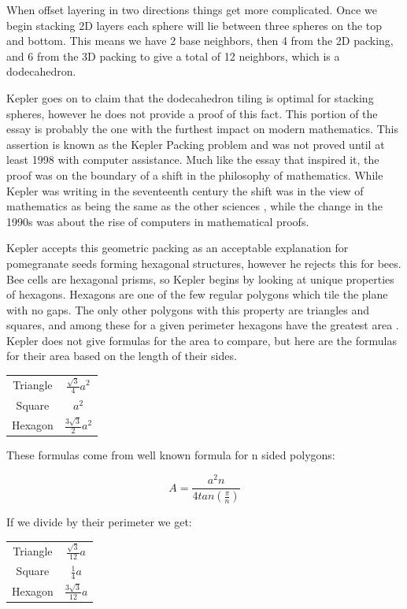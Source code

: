 \documentclass{report}
\begin{document}
When offset layering in two directions things get more complicated. Once we begin stacking 2D layers each sphere will lie between
three spheres on the top and bottom. This means we have 2 base neighbors, then 4 from the 2D packing, and 6 from the 3D packing to
give a total of 12 neighbors, which is a dodecahedron. 

Kepler goes on to claim that the dodecahedron tiling is optimal for stacking spheres, however he does not provide a proof of this 
fact. This portion of the essay is probably the one with the furthest impact on modern mathematics. This assertion is known as 
the Kepler Packing problem and was not proved until at least 1998 \cite{retrospect} with computer assistance. Much like the 
essay that inspired it, the proof was on the boundary of a shift in the philosophy of mathematics. While Kepler was writing in 
the seventeenth century the shift was in the view of mathematics as being the same as the other sciences \cite{snow}, while the change in
the 1990s was about the rise of computers in mathematical proofs.

Kepler accepts this geometric packing as an acceptable explanation for pomegranate seeds forming hexagonal structures, 
however he rejects this for bees. Bee cells are hexagonal prisms, so Kepler begins by looking at unique properties of 
hexagons. Hexagons are one of the few regular polygons which tile the plane with no gaps. The only other polygons with 
this property are triangles and squares, and among these for a given perimeter hexagons have the greatest area \cite[p.19]{kepflake}. 
Kepler does not give formulas for the area to compare, but here are the formulas for their area based on the length of their sides.


\begin{tabular}{c c}
    Triangle & $\frac{\sqrt{3}}{4} a^2$\\
    Square & $a^2$\\ 
    Hexagon & $\frac{3\sqrt{3}}{2} a^2$
\end{tabular}

These formulas come from well known formula for n sided polygons:

\begin{displaymath}
    A = \frac{a^2 n}{4 tan(\frac{\pi}{n})}
\end{displaymath}

If we divide by their perimeter we get:

\begin{tabular}{c c}
    Triangle & $\frac{\sqrt{3}}{12} a$\\
    Square & $\frac{1}{4} a$\\ 
    Hexagon & $\frac{3\sqrt{3}}{12} a$
\end{tabular}
\end{document}
